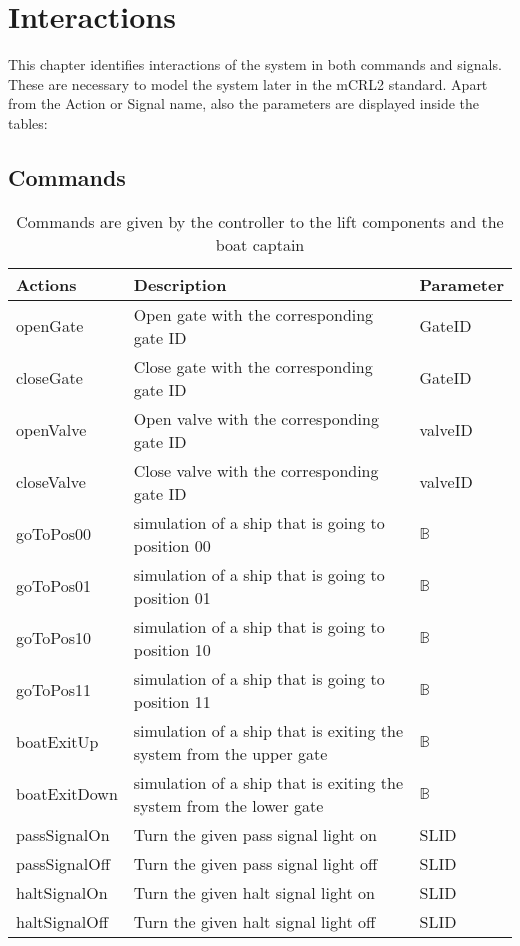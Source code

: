 \section{Interactions}
This chapter identifies interactions of the system in both commands and signals. These are necessary to model the system later in the mCRL2 standard. Apart from the Action or Signal name, also the parameters are displayed inside the tables:

\subsection{Commands}
\begin{table}[htbp]
	\centering
	\begin{tabular}{lll}
		\toprule
		\textbf{Actions} & \textbf{Description} & \textbf{Parameter} \\
		\midrule
		openGate & Open gate with the corresponding gate ID & GateID \\
		closeGate & Close gate with the corresponding gate ID & GateID \\
		openValve & Open valve with the corresponding gate ID & valveID \\
		closeValve & Close valve with the corresponding gate ID & valveID \\
		goToPos00  & simulation of a ship that is going to position 00 & $ \mathbb{B} $ \\
		goToPos01  & simulation of a ship that is going to position 01 & $ \mathbb{B} $ \\
		goToPos10  & simulation of a ship that is going to position 10 & $ \mathbb{B} $ \\
		goToPos11  & simulation of a ship that is going to position 11 & $ \mathbb{B} $ \\
		boatExitUp  & simulation of a ship that is exiting the system from the upper gate & $ \mathbb{B} $ \\
		boatExitDown  & simulation of a ship that is exiting the system from the lower gate & $ \mathbb{B} $ \\
		passSignalOn & Turn the given pass signal light on & SLID\\
		passSignalOff & Turn the given pass signal light off & SLID\\
		haltSignalOn & Turn the given halt signal light on & SLID\\
		haltSignalOff & Turn the given halt signal light off & SLID\\
		
		\bottomrule
	\end{tabular}%
	\label{tab:addlabel}%
	\caption{Commands are given by the controller to the lift components and the boat captain}
\end{table}%




